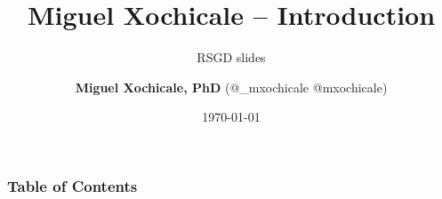 \documentclass[xcolor={dvipsnames},aspectratio=169,10pt]{beamer}
\title{  
Miguel Xochicale -- Introduction
}
\subtitle{RSGD slides}
\author{
{\bf Miguel Xochicale, PhD} (\faTwitter @\_mxochicale  \faGithub @mxochicale)
}
\date{
\today
}
\institute{
	Advanced Research Computing Centre and WEISS \\
	Universtiy College London
	}
\begin{document}
\maketitle

\begin{frame}
\frametitle{Table of Contents}
    \tableofcontents
\end{frame}








\end{document}
